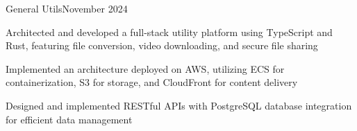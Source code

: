 \begin{resume_subsection}{General Utils}{November 2024}
    \begin{subitems}
        \item Architected and developed a full-stack utility platform using TypeScript and Rust, featuring file conversion, video downloading, and secure file sharing
        \item Implemented an architecture deployed on AWS, utilizing ECS for containerization, S3 for storage, and CloudFront for content delivery
        \item Designed and implemented RESTful APIs with PostgreSQL database integration for efficient data management
    \end{subitems}
\end{resume_subsection}

